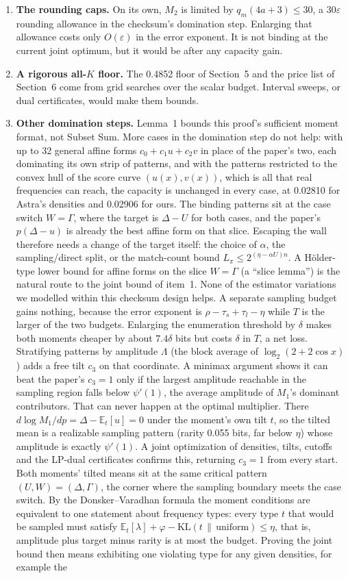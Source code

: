 \documentclass[11pt]{article}
\newcommand{\E}{\mathbb{E}}
\newcommand{\eps}{\varepsilon}
\newcommand{\KL}{\mathrm{KL}}
\theoremstyle{plain}
\begin{document}
\begin{enumerate}
\item \textbf{The rounding caps.} On its own, $M_2$ is limited by $q_m(4a+3) \le 30$, a $30\eps$ rounding allowance in the checksum's domination step. Enlarging that allowance costs only $O(\eps)$ in the error exponent. It is not binding at the current joint optimum, but it would be after any capacity gain.
\item \textbf{A rigorous all-$K$ floor.} The 0.4852 floor of Section~5 and the price list of Section~6 come from grid searches over the scalar budget. Interval sweeps, or dual certificates, would make them bounds.
\item \textbf{Other domination steps.} Lemma~1 bounds this proof's sufficient moment format, not Subset Sum. More cases in the domination step do not help: with up to 32 general affine forms $c_0 + c_1 u + c_2 v$ in place of the paper's two, each dominating its own strip of patterns, and with the patterns restricted to the convex hull of the score curve $(u(x), v(x))$, which is all that real frequencies can reach, the capacity is unchanged in every case, at 0.02810 for Astra's densities and 0.02906 for ours. The binding patterns sit at the case switch $W = \Gamma$, where the target is $\Delta - U$ for both cases, and the paper's $p(\Delta - u)$ is already the best affine form on that slice. Escaping the wall therefore needs a change of the target itself: the choice of $\alpha$, the sampling/direct split, or the match-count bound $L_\pi \le 2^{(\eta - \alpha U)n}$. A H\"older-type lower bound for affine forms on the slice $W = \Gamma$ (a ``slice lemma'') is the natural route to the joint bound of item~1. None of the estimator variations we modelled within this checksum design helps. A separate sampling budget gains nothing, because the error exponent is $\rho - \tau_s + \tau_l - \eta$ while $T$ is the larger of the two budgets. Enlarging the enumeration threshold by $\delta$ makes both moments cheaper by about $7.4\delta$ bits but costs $\delta$ in $T$, a net loss. Stratifying patterns by amplitude $\Lambda$ (the block average of $\log_2(2+2\cos x)$) adds a free tilt $c_3$ on that coordinate. A minimax argument shows it can beat the paper's $c_3 = 1$ only if the largest amplitude reachable in the sampling region falls below $\psi'(1)$, the average amplitude of $M_1$'s dominant contributors. That can never happen at the optimal multiplier. There $d \log M_1/dp = \Delta - \E_t[u] = 0$ under the moment's own tilt $t$, so the tilted mean is a realizable sampling pattern (rarity 0.055 bits, far below $\eta$) whose amplitude is exactly $\psi'(1)$. A joint optimization of densities, tilts, cutoffs and the LP-dual certificates confirms this, returning $c_3 = 1$ from every start. Both moments' tilted means sit at the same critical pattern $(U, W) = (\Delta, \Gamma)$, the corner where the sampling boundary meets the case switch. By the Donsker--Varadhan formula the moment conditions are equivalent to one statement about frequency types: every type $t$ that would be sampled must satisfy $\E_t[\lambda] + \varphi - \KL(t \,\|\, \mathrm{uniform}) \le \eta$, that is, amplitude plus target minus rarity is at most the budget. Proving the joint bound then means exhibiting one violating type for any given densities, for example the 
\end{enumerate}
\end{document}
